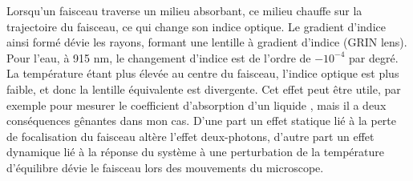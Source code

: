 
Lorsqu'un faisceau traverse un milieu absorbant, ce milieu chauffe sur la trajectoire du faisceau, ce qui change son indice optique. Le gradient d'indice ainsi formé dévie les rayons, formant une lentille à gradient d'indice (GRIN lens). Pour l'eau, à 915 nm, le changement d'indice est de l'ordre de $-10^{-4}$ par degré. La température étant plus élevée au centre du faisceau, l'indice optique est plus faible, et donc la lentille équivalente est divergente. Cet effet peut être utile, par exemple pour mesurer le coefficient d'absorption d'un liquide \cite{whinnery_laser_1974}, mais il a deux conséquences gênantes dans mon cas. D'une part un effet statique lié à la perte de focalisation du faisceau altère l'effet deux-photons, d'autre part un effet dynamique lié à la réponse du système à une perturbation de la température d'équilibre dévie le faisceau lors des mouvements du microscope.

